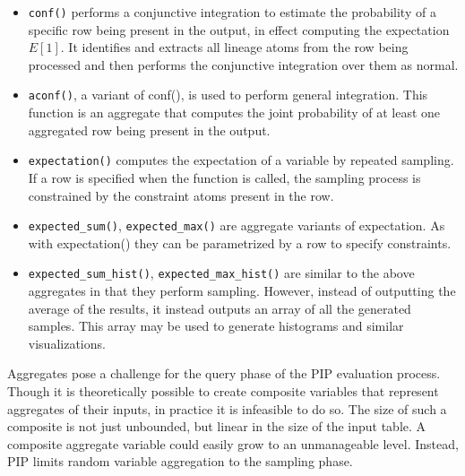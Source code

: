 \begin{itemize}
\footnotesize
\item \texttt{conf()} performs a conjunctive integration to estimate the probability of a specific row being present in the output, in effect computing the expectation $E[1]$.  It identifies and extracts all lineage atoms from the row being processed and then performs the conjunctive integration over them as normal.

\item \texttt{aconf()}, a variant of conf(), is used to perform general integration.  This function is an aggregate that computes the joint probability of at least one aggregated row being present in the output.  

\item \texttt{expectation()} computes the expectation of a variable by repeated sampling.  If a row is specified when the function is called, the sampling process is constrained by the constraint atoms present in the row.

\item \texttt{expected\_sum()}, \texttt{expected\_max()} are aggregate variants of expectation.  As with expectation() they can be parametrized by a row to specify constraints.

\item \texttt{expected\_sum\_hist()}, \texttt{expected\_max\_hist()} are similar to the above aggregates in that they perform sampling.  However, instead of outputting the average of the results, it instead outputs an array of all the generated samples.  This array may be used to generate histograms and similar visualizations.
\end{itemize}

Aggregates pose a challenge for the query phase of the PIP evaluation process.  Though it is theoretically possible to create composite variables that represent aggregates of their inputs, in practice it is infeasible to do so.  The size of such a composite is not just unbounded, but linear in the size of the input table.  A composite aggregate variable could easily grow to an unmanageable level.  Instead, PIP limits random variable aggregation to the sampling phase.  



